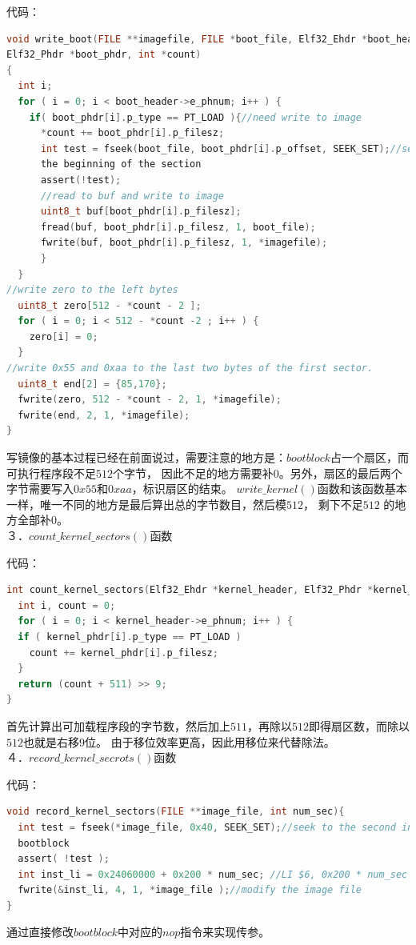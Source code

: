 \documentclass[UTF8,noindent]{ctexart}
\begin{document}
代码：
\begin{lstlisting}[language=c]
void write_boot(FILE **imagefile, FILE *boot_file, Elf32_Ehdr *boot_header,
Elf32_Phdr *boot_phdr, int *count)
{
  int i;
  for ( i = 0; i < boot_header->e_phnum; i++ ) {
    if( boot_phdr[i].p_type == PT_LOAD ){//need write to image
      *count += boot_phdr[i].p_filesz;
      int test = fseek(boot_file, boot_phdr[i].p_offset, SEEK_SET);//seek to 
      the beginning of the section
      assert(!test);
      //read to buf and write to image
      uint8_t buf[boot_phdr[i].p_filesz];
      fread(buf, boot_phdr[i].p_filesz, 1, boot_file);
      fwrite(buf, boot_phdr[i].p_filesz, 1, *imagefile);
      }
  }
//write zero to the left bytes
  uint8_t zero[512 - *count - 2 ];
  for ( i = 0; i < 512 - *count -2 ; i++ ) {
    zero[i] = 0;
  }
//write 0x55 and 0xaa to the last two bytes of the first sector.
  uint8_t end[2] = {85,170};
  fwrite(zero, 512 - *count - 2, 1, *imagefile);
  fwrite(end, 2, 1, *imagefile);
}
\end{lstlisting}
写镜像的基本过程已经在前面说过，需要注意的地方是：$bootblock$占一个扇区，而可执行程序段不足$512$个字节，
因此不足的地方需要补$0$。另外，扇区的最后两个字节需要写入$0x55$和$0xaa$，标识扇区的结束。
$write\_kernel()$函数和该函数基本一样，唯一不同的地方是最后算出总的字节数目，然后模$512$，
剩下不足$512$
的地方全部补$0$。\\

３．$count\_kernel\_sectors()$函数

代码：
\begin{lstlisting}[language=c]
int count_kernel_sectors(Elf32_Ehdr *kernel_header, Elf32_Phdr *kernel_phdr){
  int i, count = 0;
  for ( i = 0; i < kernel_header->e_phnum; i++ ) {
  if ( kernel_phdr[i].p_type == PT_LOAD )
    count += kernel_phdr[i].p_filesz;
  }
  return (count + 511) >> 9;
}
\end{lstlisting}
首先计算出可加载程序段的字节数，然后加上$511$，再除以$512$即得扇区数，而除以$512$也就是右移$9$位。
由于移位效率更高，因此用移位来代替除法。\\

４．$record\_kernel\_secrots()$函数

代码：
\begin{lstlisting}[language=c]
void record_kernel_sectors(FILE **image_file, int num_sec){
  int test = fseek(*image_file, 0x40, SEEK_SET);//seek to the second inst of 
  bootblock
  assert( !test );
  int inst_li = 0x24060000 + 0x200 * num_sec; //LI $6, 0x200 * num_sec
  fwrite(&inst_li, 4, 1, *image_file );//modify the image file
}
\end{lstlisting}
通过直接修改$bootblock$中对应的$nop$指令来实现传参。\\
\end{document}
